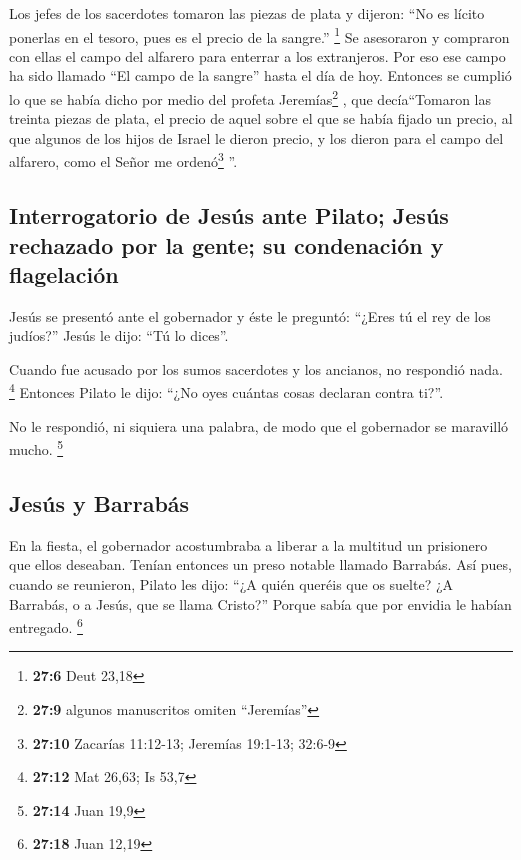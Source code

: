\begin{paracol}{2}
 Los jefes de los sacerdotes tomaron las piezas de plata y
dijeron: ``No es lícito ponerlas en el tesoro, pues es el precio de la
sangre.'' \footnote{\textbf{27:6} Deut 23,18}  Se
asesoraron y compraron con ellas el campo del alfarero para enterrar a
los extranjeros.  Por eso ese campo ha sido llamado ``El
campo de la sangre'' hasta el día de hoy.  Entonces se
cumplió lo que se había dicho por medio del profeta Jeremías\footnote{\textbf{27:9}
  algunos manuscritos omiten ``Jeremías''} , que decía``Tomaron las
treinta piezas de plata, el precio de aquel sobre el que se había fijado
un precio, al que algunos de los hijos de Israel le dieron precio,
 y los dieron para el campo del alfarero, como el Señor
me ordenó\footnote{\textbf{27:10} Zacarías 11:12-13; Jeremías 19:1-13;
  32:6-9} ''.

\hypertarget{interrogatorio-de-jesuxfas-ante-pilato-jesuxfas-rechazado-por-la-gente-su-condenaciuxf3n-y-flagelaciuxf3n}{%
\subsection{Interrogatorio de Jesús ante Pilato; Jesús rechazado por la
gente; su condenación y
flagelación}\label{interrogatorio-de-jesuxfas-ante-pilato-jesuxfas-rechazado-por-la-gente-su-condenaciuxf3n-y-flagelaciuxf3n}}

 Jesús se presentó ante el gobernador y éste le preguntó:
``¿Eres tú el rey de los judíos?'' Jesús le dijo: ``Tú lo dices''.

 Cuando fue acusado por los sumos sacerdotes y los
ancianos, no respondió nada. \footnote{\textbf{27:12} Mat 26,63; Is 53,7}
 Entonces Pilato le dijo: ``¿No oyes cuántas cosas
declaran contra ti?''.

 No le respondió, ni siquiera una palabra, de modo que el
gobernador se maravilló mucho. \footnote{\textbf{27:14} Juan 19,9}

\hypertarget{jesuxfas-y-barrabuxe1s}{%
\subsection{Jesús y Barrabás}\label{jesuxfas-y-barrabuxe1s}}

 En la fiesta, el gobernador acostumbraba a liberar a la
multitud un prisionero que ellos deseaban.  Tenían
entonces un preso notable llamado Barrabás.  Así pues,
cuando se reunieron, Pilato les dijo: ``¿A quién queréis que os suelte?
¿A Barrabás, o a Jesús, que se llama Cristo?''  Porque
sabía que por envidia le habían entregado. \footnote{\textbf{27:18} Juan
  12,19}


\end{paracol}
